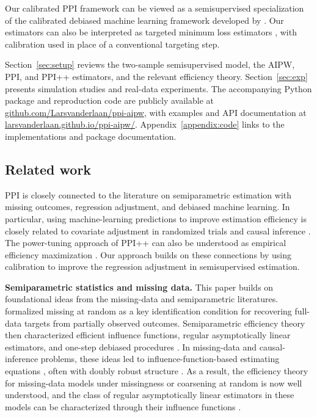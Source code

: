 \documentclass{article}
\theoremstyle{plain}
\theoremstyle{definition}
\newcommand{\1}{\mathbbm{1}}
\begin{document}
Our calibrated PPI framework can be viewed as a semisupervised
specialization of the calibrated debiased machine learning
framework developed by \citet{van2024automatic}. Our
estimators can also be interpreted as targeted minimum
loss estimators \citep{van2006targeted,vanderLaanRose2011},
with calibration used in place of a conventional targeting step.

Section~\ref{sec:setup} reviews the two-sample semisupervised
model, the AIPW, PPI, and PPI++ estimators, and the
relevant efficiency theory. Section~\ref{sec:exp} presents
simulation studies and real-data experiments.
The accompanying Python package and reproduction code
are publicly available at
\href{https://github.com/Larsvanderlaan/ppi-aipw}
{github.com/Larsvanderlaan/ppi-aipw},
with examples and API documentation at
\href{https://larsvanderlaan.github.io/ppi-aipw/}
{larsvanderlaan.github.io/ppi-aipw/}.
Appendix~\ref{appendix:code} links to the implementations and package documentation.

\subsection{Related work}

PPI is closely connected to the literature on semiparametric
estimation with missing outcomes, regression adjustment, and
debiased machine learning. In particular, using machine-learning
predictions to improve estimation efficiency is closely related
to covariate adjustment in randomized trials and causal inference
\citep{moore2009covariate,benkeser2021improving,hojbjerre2025powering}.
The power-tuning approach of PPI++ can also be understood as
empirical efficiency maximization \citep{rubin2008empirical}.
Our approach builds on these connections by using calibration
to improve the regression adjustment in semisupervised estimation.

\textbf{Semiparametric statistics and missing data.} This paper builds on foundational ideas from the missing-data and semiparametric literatures. \citet{rubin1976} formalized missing at random as a key identification condition for recovering full-data targets from partially observed outcomes. Semiparametric efficiency theory then characterized efficient influence functions, regular asymptotically linear estimators, and one-step debiased procedures \citep{levit1975efficiency,pfanzagl1985contributions,hasminskii1979nonparametric,klaassen1987consistent,bickel1993efficient}. In missing-data and causal-inference problems, these ideas led to influence-function-based estimating equations \citep{robins1994estimation,robins1995analysis,robins1995semiparametric,vanderlaanunified,tsiatis2006semiparametric}, often with doubly robust structure \citep{bang2005doubly}. As a result, the efficiency theory for missing-data models under missingness or coarsening at random is now well understood, and the class of regular asymptotically linear estimators in these models can be characterized through their influence functions \citep{robins1994estimation,robins1995analysis,robins1995semiparametric,vanderlaanunified,tsiatis2006semiparametric}.
\end{document}
